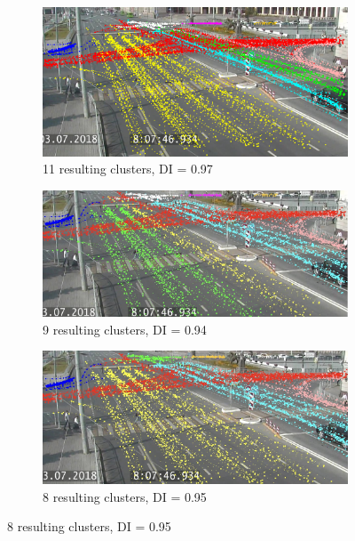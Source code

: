 \begin{figure}[!htb]
	\centering
	\begin{subfigure}[!htb]{0.495\textwidth}
		\centering{}
		\includegraphics[width=\textwidth]{images/11cl-di-1.jpeg}
		\caption{11 resulting clusters, DI = 0.97}
		\label{fig:11cl-di-1}
	\end{subfigure}
	\hfill
	\begin{subfigure}[!htb]{0.495\textwidth}
		\centering{}
		\includegraphics[width=\textwidth]{images/9cl-di-1.jpeg}
		\caption{9 resulting clusters, DI = 0.94}
		\label{fig:9cl-di-1}
	\end{subfigure}
	\hfill
	\begin{subfigure}[!htb]{0.495\textwidth}
		\centering{}
		\includegraphics[width=\textwidth]{images/8cl-di-1.jpeg}
		\caption{8 resulting clusters, DI = 0.95}

\end{subfigure}
\end{figure}
